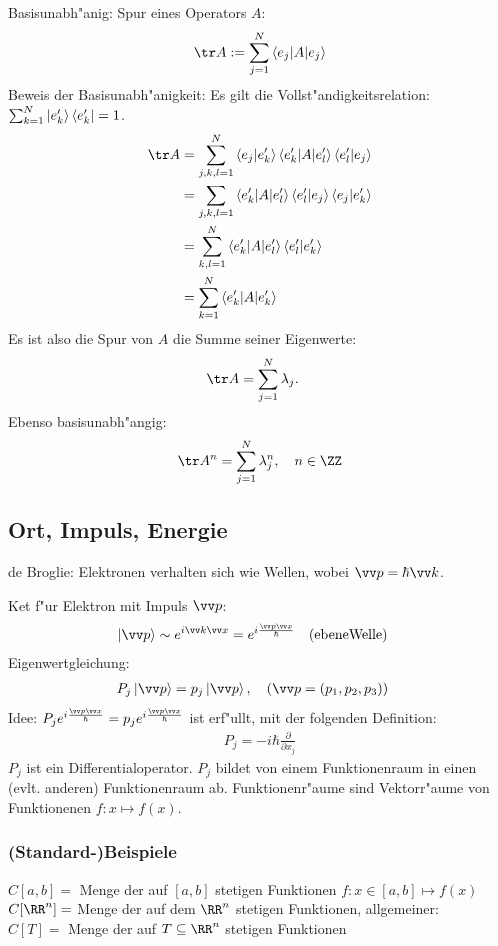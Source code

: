 \documentclass[a4paper]{scrartcl}
\begin{document}
{Basisunabh"anig: Spur eines Operators $A$:
\begin{align}
\tr A := \sum_{j=1}^N \braket {e_j | A | e_j }
\end{align}
Beweis der Basisunabh"anigkeit: Es gilt die Vollst"andigkeitsrelation: $\sum_{k=1}^N \ket{e_k'} \bra{e_k'} = 1$.
\begin{align*}
\tr A & = \sum_{j,k,l =1}^N \braket{ e_j | e_k'} \braket{ e_k' | A | e_l'} \braket{e_l' | e_j} \\
& = \sum_{j,k,l=1} \braket{ e_k' | A | e_l' } \braket{ e_l' | e_j} \braket{e_j | e_k'} \\
& = \sum_{k,l=1}^N \braket{ e_k' | A | e_l'} \braket{ e_l' | e_k'} \\
& = \sum_{k=1}^N \braket{ e_k' | A | e_k'}
\end{align*} 
Es ist also die Spur von $A$ die Summe seiner Eigenwerte:
\begin{align}
\tr A & = \sum_{j=1}^N \lambda_j.
\end{align}
Ebenso basisunabh"angig:
\begin{align}
\tr A^n = \sum_{j=1}^N \lambda_j^n, \quad n \in \ZZ
\end{align}

\subsection{Ort, Impuls, Energie}
de Broglie: Elektronen verhalten sich wie Wellen, wobei $\vv p = \hbar \vv k$.

Ket f"ur Elektron mit Impuls $\vv p$:
\begin{align}
\ket{\vv p } & \sim e^{i \vv k \vv x} = e^{i \frac{\vv p \vv x}{\hbar}} \quad \mathrm{(ebene Welle)}
\end{align}
Eigenwertgleichung:
\begin{align}
P_j \ket { \vv p} & = p_j \ket{\vv p}, \quad (\vv p = (p_1, p_2, p_3))
\end{align}
Idee: $P_j e^{i \frac{ \vv p \vv x}{\hbar}} = p_j e^{i \frac{ \vv p \vv x }{\hbar}}$ ist erf"ullt, mit der folgenden Definition:
\begin{align}
P_j = -i\hbar \frac{\partial}{\partial x_j}
\end{align}
$P_j$ ist ein Differentialoperator. $P_j$ bildet von einem Funktionenraum in einen (evlt. anderen) Funktionenraum ab. Funktionenr"aume sind Vektorr"aume von Funktionenen $f: x \mapsto f(x)$.

\subsubsection*{(Standard-)Beispiele}
\begin{1aufz}
\item $C[a,b] = $ Menge der auf $[a,b]$ stetigen Funktionen $f: x \in [a,b] \mapsto f(x)$ \\
$C[\RR^n] = $ Menge der auf dem $\RR^n$ stetigen Funktionen, allgemeiner: \\
$C[T] = $ Menge der auf $T \subseteq \RR^n$ stetigen Funktionen


\end{1aufz}}
\end{document}
